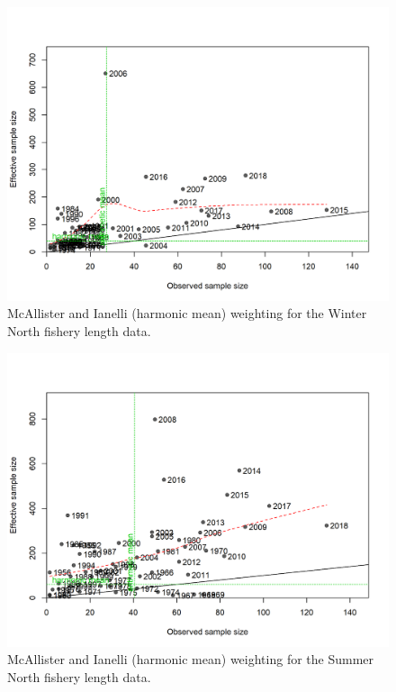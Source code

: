 \documentclass[12pt,]{article}
\begin{document}
\begin{figure}
\centering
\includegraphics{r4ss/plots_mod1/comp_lenfit_sampsize_flt1mkt2.png}
\caption{McAllister and Ianelli (harmonic mean) weighting for the Winter
North fishery length data. \label{fig:harm_mean_wn}}
\end{figure}

\FloatBarrier

\begin{figure}
\centering
\includegraphics{r4ss/plots_mod1/comp_lenfit_sampsize_flt2mkt2.png}
\caption{McAllister and Ianelli (harmonic mean) weighting for the Summer
North fishery length data. \label{fig:harm_mean_sn}}
\end{figure}
\end{document}
